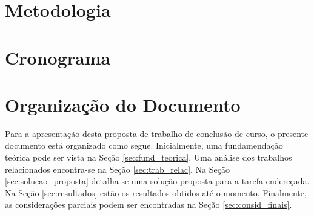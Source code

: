 \section{Metodologia}\label{sec:metodo}


\section{Cronograma}\label{sec:crono}


\section{Organização do Documento}
Para a apresentação desta proposta de trabalho de conclusão de curso, o presente documento está organizado como segue. Inicialmente, uma fundamendação teórica pode ser vista na Seção \ref{sec:fund_teorica}. Uma análise dos trabalhos relacionados encontra-se na Seção \ref{sec:trab_relac}. Na Seção \ref{sec:solucao_proposta} detalha-se uma solução proposta para a tarefa endereçada. Na Seção \ref{sec:resultados} estão os resultados obtidos até o momento. Finalmente, as considerações parciais podem ser encontradas na Seção \ref{sec:consid_finais}.
